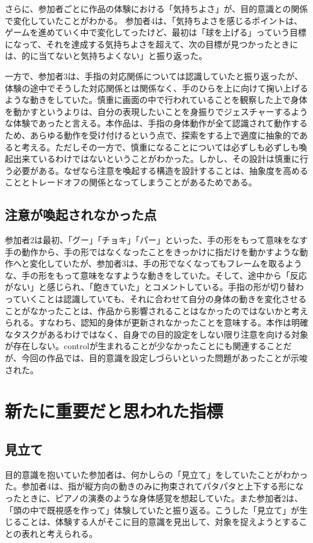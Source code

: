 さらに、参加者ごとに作品の体験における「気持ちよさ」が、目的意識との関係で変化していたことがわかる。
参加者4は、「気持ちよさを感じるポイントは、ゲームを進めていく中で変化してったけど、最初は「球を上げる」っていう目標になって、それを達成する気持ちよさを超えて、次の目標が見つかったときには、的に当てないと気持ちよくない」と振り返った。

一方で、参加者3は、手指の対応関係については認識していたと振り返ったが、体験の途中でそうした対応関係とは関係なく、手のひらを上に向けて掬い上げるような動きをしていた。慎重に画面の中で行われていることを観察した上で身体を動かすというよりは、自分の表現したいことを身振りでジェスチャーするような体験であったと言える。本作品は、手指の身体動作が全て認識されて動作するため、あらゆる動作を受け付けるという点で、探索をする上で適度に抽象的であると考える。ただしその一方で、慎重になることについては必ずしも必ずしも喚起出来ているわけではないということがわかった。しかし、その設計は慎重に行う必要がある。なぜなら注意を喚起する構造を設計することは、抽象度を高めることとトレードオフの関係となってしまうことがあるためである。

\subsection{注意が喚起されなかった点}
参加者2は最初、「グー」「チョキ」「パー」といった、手の形をもって意味をなす手の動作から、手の形ではなくなったことをきっかけに指だけを動かすような動作へと変化していたが、参加者3は、手の形でなくなってもフレームを取るような、手の形をもって意味をなすような動きをしていた。そして、途中から「反応がない」と感じられ、「飽きていた」とコメントしている。手指の形が切り替わっていくことは認識していても、それに合わせて自分の身体の動きを変化させることがなかったことは、作品から影響されることはなかったのではないかと考えられる。すなわち、認知的身体が更新されなかったことを意味する。本作は明確なタスクがあるわけではなく、自身での目的設定をしない限り注意を向ける対象が存在しない。controlが生まれることが少なかったことにも関連することだが、今回の作品では、目的意識を設定しづらいといった問題があったことが示唆された。

\section{新たに重要だと思われた指標}
\subsection{見立て}
目的意識を抱いていた参加者は、何かしらの「見立て」をしていたことがわかった。参加者4は、指が縦方向の動きのみに拘束されてパタパタと上下する形になったときに、ピアノの演奏のような身体感覚を想起していた。また参加者2は、「頭の中で既視感を作って」体験していたと振り返る。こうした「見立て」が生じることは、体験する人がそこに目的意識を見出して、対象を捉えようとすることの表れと考えられる。

